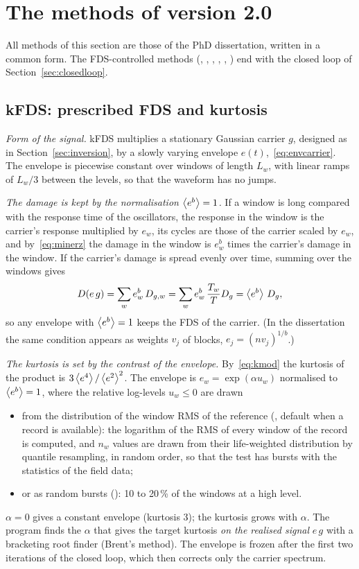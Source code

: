 \section{The methods of version 2.0}\label{sec:methods}

All methods of this section are those of the PhD dissertation, written in a common form. The
FDS-controlled methods (, , , , , )
end with the closed loop of Section~\ref{sec:closedloop}.

\subsection{kFDS: prescribed FDS and kurtosis}\label{sec:kfds}

\emph{Form of the signal.} kFDS multiplies a stationary Gaussian carrier $g$, designed as in
Section~\ref{sec:inversion}, by a slowly varying envelope $e(t)$,~\eqref{eq:envcarrier}. The envelope
is piecewise constant over windows of length $L_w$, with linear ramps of $L_w/3$ between the levels, so
that the waveform has no jumps.

\emph{The damage is kept by the normalisation $\left\langle e^b \right\rangle = 1$.} If a window is long compared with the
response time of the oscillators, the response in the window is the carrier's response multiplied by
$e_w$, its cycles are those of the carrier scaled by $e_w$, and by~\eqref{eq:minerz} the damage in the
window is $e_w^b$ times the carrier's damage in the window. If the carrier's damage is spread evenly
over time, summing over the windows gives
\begin{equation}
  D(e\,g) = \sum_w e_w^b\,D_{g,w} = \sum_w e_w^b\,\frac{T_w}{T}D_g = \left\langle e^b \right\rangle\,D_g ,
\end{equation}
so any envelope with $\left\langle e^b \right\rangle=1$ keeps the FDS of the carrier. (In the dissertation the same
condition appears as weights $v_j$ of blocks, $e_j = (n v_j)^{1/b}$.)

\emph{The kurtosis is set by the contrast of the envelope.} By~\eqref{eq:kmod} the kurtosis of the
product is $3\left\langle e^4 \right\rangle/\left\langle e^2 \right\rangle^2$. The envelope is $e_w = \exp(\alpha u_w)$ normalised to
$\left\langle e^b \right\rangle=1$, where the relative log-levels $u_w\le0$ are drawn
\begin{itemize}[nosep]
\item from the distribution of the window RMS of the reference (,
default when a record is available): the logarithm of the RMS of every window of the record is
computed, and $n_w$ values are drawn from their life-weighted distribution by quantile resampling, in
random order, so that the test has bursts with the statistics of the field data;
\item or as random bursts (): 10 to 20\,\% of the windows at a high level.
\end{itemize}
$\alpha = 0$ gives a constant envelope (kurtosis 3); the kurtosis grows with $\alpha$. The program
finds the $\alpha$ that gives the target kurtosis \emph{on the realised signal} $e\,g$ with a
bracketing root finder (Brent's method). The envelope is frozen after the first two iterations of the
closed loop, which then corrects only the carrier spectrum.

